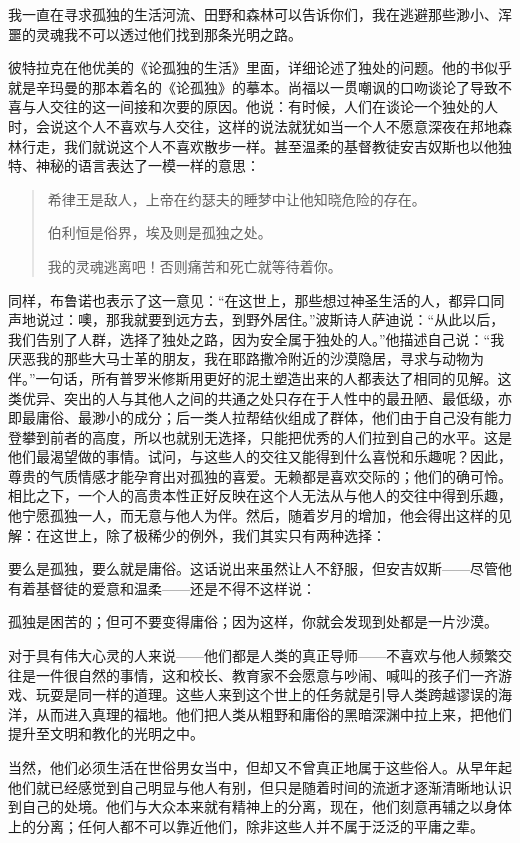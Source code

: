 \documentclass[11pt,oneside]{article}
\begin{document}
\begin{common-format}
我一直在寻求孤独的生活河流、田野和森林可以告诉你们，我在逃避那些渺小、浑噩的灵魂我不可以透过他们找到那条光明之路。 

彼特拉克在他优美的《论孤独的生活》里面，详细论述了独处的问题。他的书似乎就是辛玛曼的那本着名的《论孤独》的摹本。尚福以一贯嘲讽的口吻谈论了导致不喜与人交往的这一间接和次要的原因。他说：有时候，人们在谈论一个独处的人时，会说这个人不喜欢与人交往，这样的说法就犹如当一个人不愿意深夜在邦地森林行走，我们就说这个人不喜欢散步一样。甚至温柔的基督教徒安吉奴斯也以他独特、神秘的语言表达了一模一样的意思： 
\begin{verse}
希律王是敌人，上帝在约瑟夫的睡梦中让他知晓危险的存在。

伯利恒是俗界，埃及则是孤独之处。 

我的灵魂逃离吧！否则痛苦和死亡就等待着你。 
\end{verse}
 
同样，布鲁诺也表示了这一意见：“在这世上，那些想过神圣生活的人，都异口同声地说过：噢，那我就要到远方去，到野外居住。”波斯诗人萨迪说：“从此以后，我们告别了人群，选择了独处之路，因为安全属于独处的人。”他描述自己说：“我厌恶我的那些大马士革的朋友，我在耶路撒冷附近的沙漠隐居，寻求与动物为伴。”一句话，所有普罗米修斯用更好的泥土塑造出来的人都表达了相同的见解。这类优异、突出的人与其他人之间的共通之处只存在于人性中的最丑陋、最低级，亦即最庸俗、最渺小的成分；后一类人拉帮结伙组成了群体，他们由于自己没有能力登攀到前者的高度，所以也就别无选择，只能把优秀的人们拉到自己的水平。这是他们最渴望做的事情。试问，与这些人的交往又能得到什么喜悦和乐趣呢？因此，尊贵的气质情感才能孕育出对孤独的喜爱。无赖都是喜欢交际的；他们的确可怜。相比之下，一个人的高贵本性正好反映在这个人无法从与他人的交往中得到乐趣，他宁愿孤独一人，而无意与他人为伴。然后，随着岁月的增加，他会得出这样的见解：在这世上，除了极稀少的例外，我们其实只有两种选择： 

要么是孤独，要么就是庸俗。这话说出来虽然让人不舒服，但安吉奴斯——尽管他有着基督徒的爱意和温柔——还是不得不这样说： 

孤独是困苦的；但可不要变得庸俗；因为这样，你就会发现到处都是一片沙漠。 

对于具有伟大心灵的人来说——他们都是人类的真正导师——不喜欢与他人频繁交往是一件很自然的事情，这和校长、教育家不会愿意与吵闹、喊叫的孩子们一齐游戏、玩耍是同一样的道理。这些人来到这个世上的任务就是引导人类跨越谬误的海洋，从而进入真理的福地。他们把人类从粗野和庸俗的黑暗深渊中拉上来，把他们提升至文明和教化的光明之中。 

当然，他们必须生活在世俗男女当中，但却又不曾真正地属于这些俗人。从早年起他们就已经感觉到自己明显与他人有别，但只是随着时间的流逝才逐渐清晰地认识到自己的处境。他们与大众本来就有精神上的分离，现在，他们刻意再辅之以身体上的分离；任何人都不可以靠近他们，除非这些人并不属于泛泛的平庸之辈。 


\end{common-format}
\end{document}
